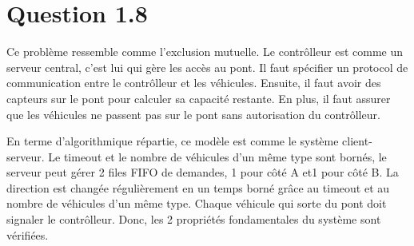 \documentclass[a4paper,11pt]{report}
\begin{document}
\section{Question 1.8}
	Ce problème ressemble comme l'exclusion mutuelle. Le contrôlleur est comme un serveur central, c'est lui qui gère les accès au pont. Il faut spécifier un protocol de communication entre le contrôlleur et les véhicules. Ensuite, il faut avoir des capteurs sur le pont pour calculer sa capacité restante. En plus, il faut assurer que les véhicules ne passent pas sur le pont sans autorisation du contrôlleur.
	
	En terme d'algorithmique répartie, ce modèle est comme le système client-serveur. Le timeout et le nombre de véhicules d'un même type sont bornés, le serveur peut gérer 2 files FIFO de demandes, 1 pour côté A et1 pour côté B. La direction est changée régulièrement en un temps borné grâce au timeout et au nombre de véhicules d'un même type. Chaque véhicule qui sorte du pont doit signaler le contrôlleur. Donc, les 2 propriétés fondamentales du système sont vérifiées.
\end{document}
